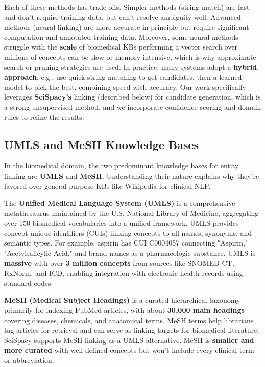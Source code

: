 Each of these methods has trade-offs. Simpler methods (string match) are fast and don't require training data, but can't resolve ambiguity well. Advanced methods (neural linking) are more accurate in principle but require significant computation and annotated training data. Moreover, some neural methods struggle with the \textbf{scale} of biomedical KBs performing a vector search over millions of concepts can be slow or memory-intensive, which is why approximate search or pruning strategies are used. In practice, many systems adopt a \textbf{hybrid approach}: e.g., use quick string matching to get candidates, then a learned model to pick the best, combining speed with accuracy. Our work specifically leverages \textbf{SciSpacy's} linking (described below) for candidate generation, which is a strong unsupervised method, and we incorporate confidence scoring and domain rules to refine the results.

\subsection{UMLS and MeSH Knowledge Bases}

In the biomedical domain, the two predominant knowledge bases for entity linking are \textbf{UMLS} and \textbf{MeSH}. Understanding their nature explains why they're favored over general-purpose KBs like Wikipedia for clinical NLP.

The \textbf{Unified Medical Language System (UMLS)} \parencite{UMLS2024} is a comprehensive metathesaurus maintained by the U.S. National Library of Medicine, aggregating over 150 biomedical vocabularies into a unified framework. UMLS provides concept unique identifiers (CUIs) linking concepts to all names, synonyms, and semantic types. For example, aspirin has CUI C0004057 connecting "Aspirin," "Acetylsalicylic Acid," and brand names as a pharmacologic substance. UMLS is \textbf{massive} with over \textbf{3 million concepts} from sources like SNOMED CT, RxNorm, and ICD, enabling integration with electronic health records using standard codes.

\textbf{MeSH (Medical Subject Headings)} \parencite{Neumann2019} is a curated hierarchical taxonomy primarily for indexing PubMed articles, with about \textbf{30,000 main headings} covering diseases, chemicals, and anatomical terms. MeSH terms help librarians tag articles for retrieval and can serve as linking targets for biomedical literature. SciSpacy supports MeSH linking as a UMLS alternative. MeSH is \textbf{smaller and more curated} with well-defined concepts but won't include every clinical term or abbreviation.

